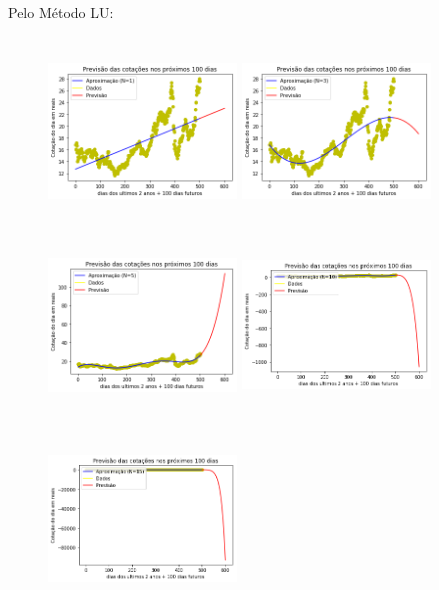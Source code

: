 \documentclass{article}
\begin{document}
\item Pelo Método LU:
\begin{figure}[!htb]
\includegraphics [width=5cm,height=5cm]{Previsao (usando LU)/P1.png}
\includegraphics [width=5cm,height=5cm]{Previsao (usando LU)/P3.png}
\includegraphics [width=5cm,height=5cm]{Previsao (usando LU)/P5.png}
\includegraphics [width=5cm,height=5cm]{Previsao (usando LU)/P10.png}
\includegraphics [width=5cm,height=5cm]{Previsao (usando LU)/P15.png}

\end{figure}
\end{document}
